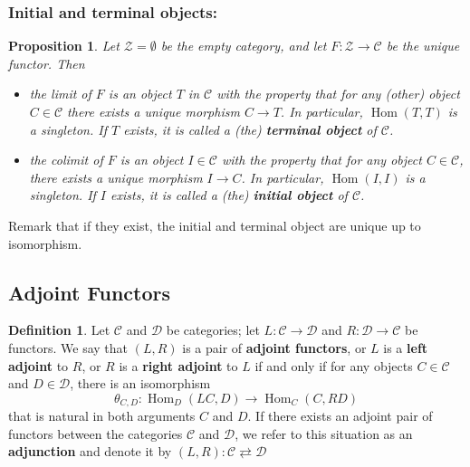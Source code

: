 \documentclass{article}
\theoremstyle{plain}
\newtheorem{proposition}[theorem]{Proposition}
\theoremstyle{definition}
\newtheorem{definition}[theorem]{Definition}
\DeclareMathOperator{\Hom}{Hom}
\begin{document}
\subsubsection*{Initial and terminal objects:}

\begin{proposition}
Let 
$\mathcal{Z} =  \emptyset$ be the empty category, and let 
$F : \mathcal{Z}\rightarrow \mathcal{C}$
be the unique functor. Then
\begin{itemize}
    \item[$i)$] the limit of $F$ is an object $T$ in $\mathcal{C}$ with the property that for any (other) object $C\in\mathcal{C}$ there exists a unique morphism $C\rightarrow T$. In particular, $\Hom(T,T)$ is a singleton. If $T$ exists, it is called a (the) \textbf{terminal object} of $\mathcal{C}$.
    
    \item[$ii)$]the colimit of $F$ is an object $I\in \mathcal{C}$ with the property that for any object $C\in\mathcal{C}$, there exists a unique morphism $I\rightarrow C$. In particular, $\Hom(I,I)$ is a singleton. If $I$ exists, it is called a (the) \textbf{initial object} of $\mathcal{C}$.
\end{itemize}
\end{proposition}

\noindent Remark that if they exist, the initial and terminal object are unique up to isomorphism.\\



\subsection{Adjoint Functors}

\begin{definition}
    Let $\mathcal{C}$ and $\mathcal{D}$ be categories; let $L : \mathcal{C}\rightarrow\mathcal{D}$ and $R : \mathcal{D}\rightarrow\mathcal{C}$ be functors. 
    We say that $(L,R)$ is a pair of \textbf{adjoint functors}, or $L$ is a \textbf{left adjoint} to $R$, or $R$ is a \textbf{right adjoint} to $L$ if and only if for any objects $C \in\mathcal{C}$ and $D\in\mathcal{D}$, there is an isomorphism
$$ \theta_{C,D} : \Hom_D(LC,D)  \rightarrow \Hom_C (C,RD) $$
that is natural in both arguments $C$ and $D$. 
If there exists an adjoint pair of functors between the categories $\mathcal{C}$ and $\mathcal{D}$, we refer to this situation as an \textbf{adjunction} and denote it by $(L,R):\mathcal{C} \rightleftarrows \mathcal{D}$
\end{definition} 
\end{document}
